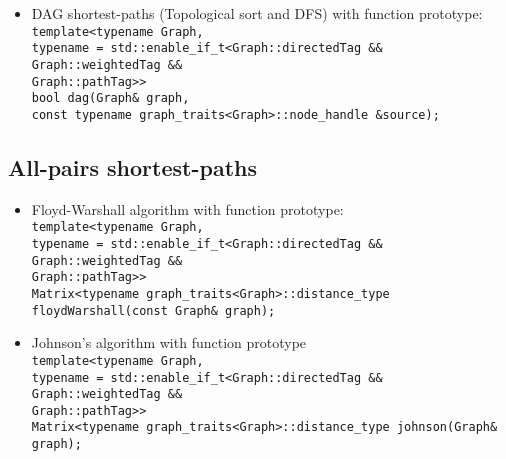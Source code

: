 \documentclass{article}
\begin{document}
\begin{itemize}
	\item DAG shortest-paths (Topological sort and DFS) with function prototype:\\
		\texttt{template<typename Graph,\\\hspace*{4em}
						 typename = std::enable\_if\_t<Graph::directedTag \&\&\\\hspace*{17.8em}
													   Graph::weightedTag \&\&\\\hspace*{17.8em}
													   Graph::pathTag>>\\
		bool dag(Graph\& graph, \\\hspace*{4em}
				const typename graph\_traits<Graph>::node\_handle \&source);}
\end{itemize}

\subsection*{All-pairs shortest-paths}
\begin{itemize}
	\item Floyd-Warshall algorithm with function prototype:\\
		\texttt{template<typename Graph,\\\hspace*{4em}
				typename = std::enable\_if\_t<Graph::directedTag \&\&\\\hspace*{17.8em}
							Graph::weightedTag \&\&\\\hspace*{17.8em}
							Graph::pathTag>>\\
		Matrix<typename graph\_traits<Graph>::distance\_type floydWarshall(const Graph\& graph);}
	\item Johnson's algorithm with function prototype\\
		\texttt{template<typename Graph,\\\hspace*{4em}
						 typename  = std::enable\_if\_t<Graph::directedTag \&\&\\\hspace*{17.8em}
														Graph::weightedTag \&\&\\\hspace*{17.8em}
														Graph::pathTag>>\\
		Matrix<typename graph\_traits<Graph>::distance\_type johnson(Graph\& graph);}
\end{itemize}
\end{document}
